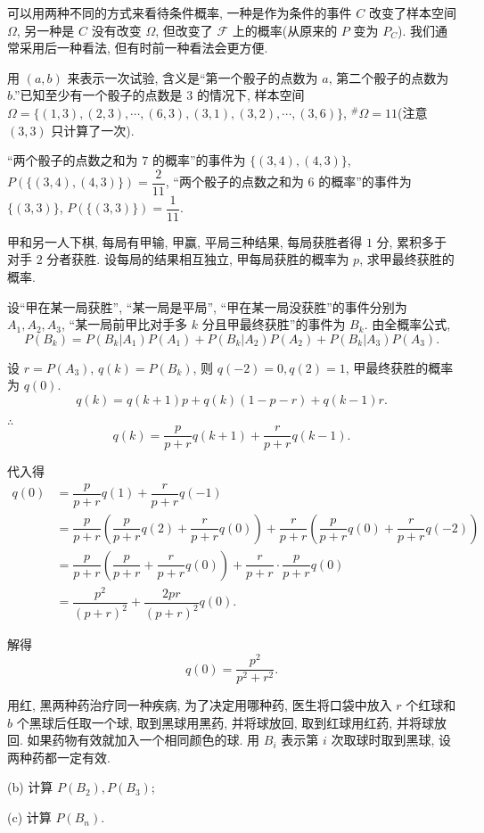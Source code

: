 \documentclass{ctexart}
\begin{document}
可以用两种不同的方式来看待条件概率, 一种是作为条件的事件 $C$ 改变了样本空间 $\Omega$, 另一种是 $C$ 没有改变 $\Omega$, 但改变了 $\mathcal{F}$ 上的概率(从原来的 $P$ 变为 $P_C$). 我们通常采用后一种看法, 但有时前一种看法会更方便.
\begin{solution}[另一种解法]
    用 $(a,b)$ 来表示一次试验, 含义是``第一个骰子的点数为 $a$, 第二个骰子的点数为 $b$.''已知至少有一个骰子的点数是 $3$ 的情况下, 样本空间 $\Omega=\{(1,3),(2,3),\cdots,(6,3),(3,1),(3,2),\cdots,(3,6)\}$, $^\#\Omega=11$(注意 $(3,3)$ 只计算了一次).

    ``两个骰子的点数之和为 $7$ 的概率''的事件为 $\{(3,4),(4,3)\}$, $P(\{(3,4),(4,3)\})=\dfrac{2}{11}$, ``两个骰子的点数之和为 $6$ 的概率''的事件为 $\{(3,3)\}$, $P(\{(3,3)\})=\dfrac{1}{11}$.
\end{solution}
\addtocounter{exercise}{6}
\begin{exercise}%
    甲和另一人下棋, 每局有甲输, 甲赢, 平局三种结果, 每局获胜者得 $1$ 分, 累积多于对手 $2$ 分者获胜. 设每局的结果相互独立, 甲每局获胜的概率为 $p$, 求甲最终获胜的概率.
\end{exercise}
\begin{solution}
    设``甲在某一局获胜'', ``某一局是平局'', ``甲在某一局没获胜''的事件分别为 $A_1,A_2,A_3$, ``某一局前甲比对手多 $k$ 分且甲最终获胜''的事件为 $B_k$. 由全概率公式,
    \[P(B_k)=P(B_k|A_1)P(A_1)+P(B_k|A_2)P(A_2)+P(B_k|A_3)P(A_3).\]

    设 $r=P(A_3)$, $q(k)=P(B_k)$, 则 $q(-2)=0,q(2)=1$, 甲最终获胜的概率为 $q(0)$.
    \[q(k)=q(k+1)p+q(k)(1-p-r)+q(k-1)r.\]

    $\therefore$
    \[q(k)=\dfrac{p}{p+r}q(k+1)+\dfrac{r}{p+r}q(k-1).\]

    代入得
    \begin{align*}
        q(0) & =\dfrac{p}{p+r}q(1)+\dfrac{r}{p+r}q(-1) \\
        & =\dfrac{p}{p+r}\left(\dfrac{p}{p+r}q(2)+\dfrac{r}{p+r}q(0)\right)+\dfrac{r}{p+r}\left(\dfrac{p}{p+r}q(0)+\dfrac{r}{p+r}q(-2)\right) \\
        & =\dfrac{p}{p+r}\left(\dfrac{p}{p+r}+\dfrac{r}{p+r}q(0)\right)+\dfrac{r}{p+r}\cdot\dfrac{p}{p+r}q(0) \\
        & =\dfrac{p^2}{(p+r)^2}+\dfrac{2pr}{(p+r)^2}q(0).
    \end{align*}

    解得
    \[q(0)=\dfrac{p^2}{p^2+r^2}.\]
\end{solution}
\begin{exercise}%
    用红, 黑两种药治疗同一种疾病, 为了决定用哪种药, 医生将口袋中放入 $r$ 个红球和 $b$ 个黑球后任取一个球, 取到黑球用黑药, 并将球放回, 取到红球用红药, 并将球放回. 如果药物有效就加入一个相同颜色的球. 用 $B_i$ 表示第 $i$ 次取球时取到黑球, 设两种药都一定有效.

    (b) 计算 $P(B_2),P(B_3)$;

    (c) 计算 $P(B_n)$.
\end{exercise}
\end{document}
